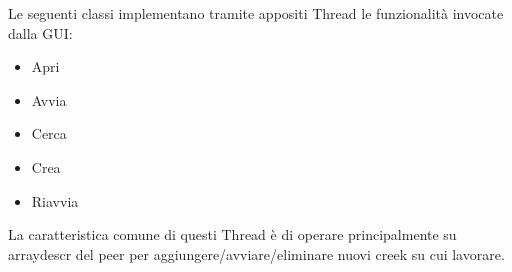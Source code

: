 Le seguenti classi implementano tramite appositi Thread le funzionalit\`a invocate dalla GUI:
\begin{itemize}
\item Apri
\item Avvia
\item Cerca
\item Crea
\item Riavvia
\end{itemize}

La caratteristica comune di questi Thread \`e di operare principalmente su arraydescr del peer per aggiungere/avviare/eliminare nuovi creek su cui lavorare.
